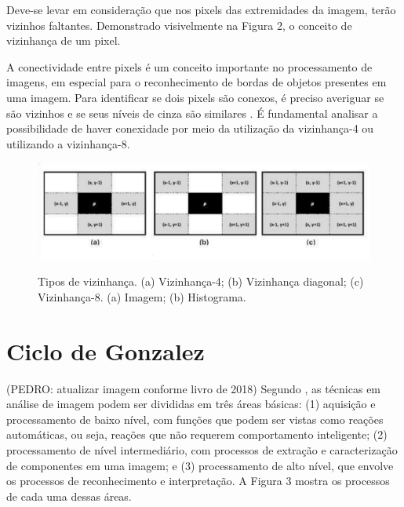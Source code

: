 Deve-se levar em consideração que nos pixels das extremidades da imagem, terão vizinhos faltantes.  Demonstrado visivelmente na Figura 2, o conceito de vizinhança de um pixel. %

A conectividade entre pixels é um conceito importante no processamento de imagens, em especial para o reconhecimento de bordas de objetos presentes em uma imagem. Para identificar se dois pixels são conexos, é preciso averiguar se são vizinhos e se seus níveis de cinza são similares . É fundamental analisar a possibilidade de haver conexidade por meio da utilização da vizinhança-4 ou utilizando a vizinhança-8.

 \begin{figure}[htb]
	\centering
	\includegraphics[width=1.0\textwidth]{Imagens/imagem3} %
	\caption[Texto que vai aparecer na lista de fig.]{Tipos de vizinhança. (a) Vizinhança-4; (b) Vizinhança diagonal; (c) Vizinhança-8.  (a) Imagem; (b) Histograma.}
	\label{fig:tux_laplace}
\end{figure}



\section{Ciclo de Gonzalez}
(PEDRO: atualizar imagem conforme livro de 2018)
Segundo , as técnicas em análise de imagem podem ser divididas em três áreas básicas: (1) aquisição e processamento de baixo nível, com funções que podem ser vistas como reações automáticas, ou seja, reações que não requerem comportamento inteligente; (2) processamento de nível intermediário, com processos de extração e caracterização de componentes em uma imagem; e (3) processamento de alto nível, que envolve os processos de reconhecimento e interpretação. A Figura 3 mostra os processos de cada uma dessas áreas.

